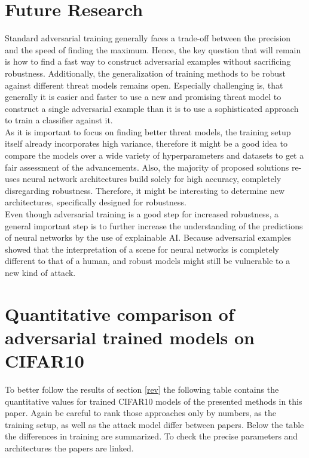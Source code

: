 \documentclass{article}
\begin{document}
\section{Future Research}
Standard adversarial training generally faces a trade-off between the precision and the speed of finding the maximum. Hence, the key question that will remain is how to find a fast way to construct adversarial examples without sacrificing robustness. Additionally, the generalization of training methods to be robust against different threat models remains open. Especially challenging is, that generally it is easier and faster to use a new and promising threat model to construct a single adversarial example than it is to use a sophisticated approach to train a classifier against it. \\
As it is important to focus on finding better threat models, the training setup itself already incorporates high variance, therefore it might be a good idea to compare the models over a wide variety of hyperparameters and datasets to get a fair assessment of the advancements. Also, the majority of proposed solutions re-uses neural network architectures build solely for high accuracy, completely disregarding robustness. Therefore, it might be interesting to determine new architectures, specifically designed for robustness. \\
Even though adversarial training is a good step for increased robustness, a general important step is to further increase the understanding of the predictions of neural networks by the use of explainable AI. Because adversarial examples showed that the interpretation of a scene for neural networks is completely different to that of a human, and robust models might still be vulnerable to a new kind of attack.  

\newpage

\appendix
\section{Quantitative comparison of adversarial trained models on CIFAR10}
To better follow the results of section \ref{rev} the following table contains the quantitative values for trained CIFAR10 models of the presented methods in this paper. Again be careful to rank those approaches only by numbers, as the training setup, as well as the attack model differ between papers. Below the table the differences in training are summarized. To check the precise parameters and architectures the papers are linked.
\vspace*{-0.2cm}
\end{document}
